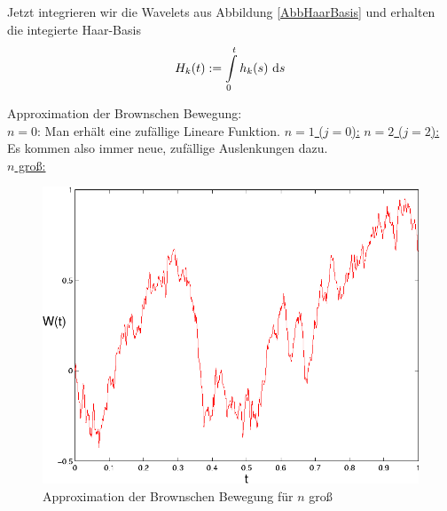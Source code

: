 Jetzt integrieren wir die Wavelets aus Abbildung \ref{AbbHaarBasis} und erhalten die integierte Haar-Basis
\begin{align*}
	H_k(t):=\int\limits_0^t h_k(s)\text{ d} s
\end{align*}


Approximation der Brownschen Bewegung:\\
\underline{$n=0$}: Man erhält eine zufällige Lineare Funktion.\nl
\underline{$n=1$ ($j=0$):}\nl
\underline{$n=2$ ($j=2$):}\nl
Es kommen also immer neue, zufällige Auslenkungen dazu.\\
\underline{$n$ groß:}
\begin{figure}[H]
	\begin{center}
		\includegraphics[width=1\textwidth]{./pics/BB.png}
		\caption{Approximation der Brownschen Bewegung für $n$ groß}
		\label{AbbBBngross}
	\end{center}
\end{figure}

